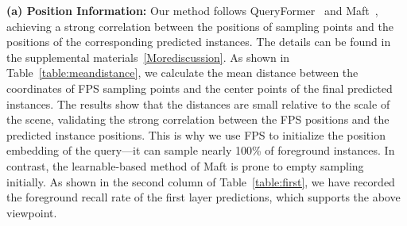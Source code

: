 \textbf{(a) Position Information:} Our method follows QueryFormer~\cite{lu2023query} and Maft~\cite{lai2023mask}, achieving a strong correlation between the positions of sampling points and the positions of the corresponding predicted instances. The details can be found in the supplemental materials~\ref{Morediscussion}. As shown in Table~\ref{table:meandistance}, we calculate the mean distance between the coordinates of FPS sampling points and the center points of the final predicted instances. The results show that the distances are small relative to the scale of the scene, validating the strong correlation between the FPS positions and the predicted instance positions. This is why we use FPS to initialize the position embedding of the query—it can sample nearly 100\% of foreground instances. In contrast, the learnable-based method of Maft is prone to empty sampling initially. As shown in the second column of Table~\ref{table:first}, we have recorded the foreground recall rate of the first layer predictions, which supports the above viewpoint.

